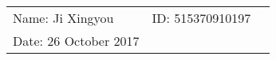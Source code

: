 \documentclass{article}
\begin{document}
\begin{spacing}{1.5}
\vspace*{0.25cm}

\hrulefill

\thispagestyle{empty}

\begin{center}
\begin{large}
\end{large}

\hrulefill

\vspace*{5cm}
\begin{Large}
\end{Large}

\vspace{2em}

\end{center}


\vfill

\begin{table}[h!]
\flushleft
\begin{tabular}{lll}
Name: Ji Xingyou \hspace*{2em}&
ID: 515370910197\hspace*{2em}
\\

Date: 26 October 2017

\end{tabular}
\end{table}

\hfill

\newpage
\tableofcontents
\newpage

\end{spacing}
\end{document}
